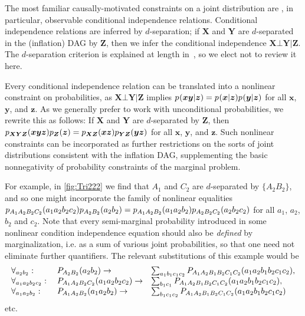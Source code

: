 The most familiar causally-motivated constraints on a joint distribution are , in particular, observable conditional independence relations. Conditional independence relations are inferred by $d$-separation; if $\bm{X}$ and $\bm{Y}$ are $d$-separated in the (inflation) DAG by $\bm{Z}$, then we infer the conditional independence $\bm{X}\bot\bm{Y}|\bm{Z}$. The $d$-separation criterion is explained at length in~\cite{pearl2009causality,studeny2005probabilistic,WoodSpekkens,pusey2014gdag}, so we elect not to review it here.

Every conditional independence relation can be translated into a nonlinear constraint on probabilities, as $\bm{X}\bot\bm{Y}|\bm{Z}$ implies $\p{\bm{x}\bm{y}|\bm{z}}=\p{\bm{x}|\bm{z}}\p{\bm{y}|\bm{z}}$ for all $\bm{x}$, $\bm{y}$, and $\bm{z}$. As we generally prefer to work with unconditional probabilities, we rewrite this as follows: If $\bm{X}$ and $\bm{Y}$ are $d$-separated by $\bm{Z}$, then $\p[\bm{X}\bm{Y}\bm{Z}]{\bm{x}\bm{y}\bm{z}}\p[\bm{Z}]{\bm{z}}=\p[\bm{X}\bm{Z}]{\bm{x}\bm{z}}\p[\bm{Y}\bm{Z}]{\bm{y}\bm{z}}$ for all $\bm{x}$, $\bm{y}$, and $\bm{z}$. Such nonlinear constraints can be incorporated as further restrictions on the sorts of joint distributions consistent with the inflation DAG, supplementing the basic nonnegativity of probability constraints of the marginal problem. 

For example, in \cref{fig:Tri222} we find that $A_1$ and $C_2$ are $d$-separated by $\{A_2 B_2\}$, and so one might incorporate the family of nonlinear equalities $\p[A_1 A_2 B_2 C_2]{a_1 a_2 b_2 c_2}\p[A_2 B_2]{a_2 b_2}=\p[A_1 A_2 B_2]{a_1 a_2 b_2}\p[A_2 B_2 C_2]{a_2 b_2 c_2}$ for all $a_1$, $a_2$, $b_2$ and $c_2$. Note that every semi-marginal probability introduced in some nonlinear condition independence equation should also be \emph{defined} by marginalization, i.e. as a sum of various joint probabilities, so that one need not eliminate further quantifiers. The relevant substitutions of this example would be
\begin{align}
\begin{array}{lll}
\forall_{a_2 b_2}:&\;\pdf[A_2 B_2]{a_2 b_2} \to& \sum\nolimits_{a_1 b_1 c_1 c_2}\pdf[A_1 A_2 B_1 B_2 C_1 C_2]{a_1 a_2 b_1 b_2 c_1 c_2},\\
\forall_{a_1 a_2 b_2 c_2}:&\;\pdf[A_1 A_2 B_2 C_2]{a_1 a_2 b_2 c_2} \to& \sum\nolimits_{b_1 c_1}\pdf[A_1 A_2 B_1 B_2 C_1 C_2]{a_1 a_2 b_1 b_2 c_1 c_2},\\
\forall_{a_1 a_2 b_2}:&\;\pdf[A_1 A_2 B_2]{a_1 a_2 b_2} \to\quad& \sum\nolimits_{b_1 c_1 c_2}\pdf[A_1 A_2 B_1 B_2 C_1 C_2]{a_1 a_2 b_1 b_2 c_1 c_2}
\end{array}
\end{align}
etc. 

